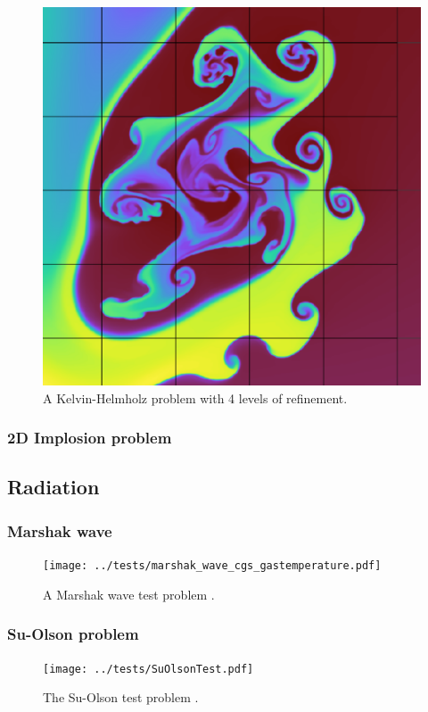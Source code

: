 \documentclass[fleqn,usenatbib]{mnras}
\begin{document}
\begin{figure}
    \includegraphics[width=0.9\columnwidth]{quokka_zoom2.pdf}
    \caption{A Kelvin-Helmholz problem with 4 levels of refinement.}
    \label{fig:kh_zoom}
\end{figure}
\subsubsection{2D Implosion problem}

\subsection{Radiation}
\subsubsection{Marshak wave}
\begin{figure}
    \texttt{[image: ../tests/marshak\_wave\_cgs\_gastemperature.pdf]}
    \caption{A Marshak wave test problem \citep{Su_1996}.}
    \label{fig:marshak}
\end{figure}
\subsubsection{Su-Olson problem}
\begin{figure}
    \texttt{[image: ../tests/SuOlsonTest.pdf]}
    \caption{The Su-Olson test problem \citep{Su_1997}.}
    \label{fig:suolson}
\end{figure}
\end{document}
